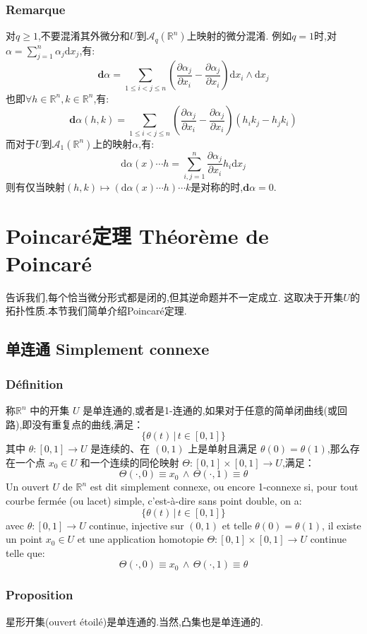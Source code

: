 \documentclass[12pt, a4paper, oneside]{ctexbook}
\newcommand{\di }{\text{d}}%
\newcommand{\pian }{\partial}%
\newcommand{\die }{\textbf{d}}%
\newcommand{\R }{\mathbb{R}}%
\begin{document}
  \subsubsection{Remarque}
  对$q\geq 1$,不要混淆其外微分和$U$到$\mathcal{A}_q(\R^n)$上映射的微分混淆.
  例如$q=1$时,对$\alpha=\sum_{j=1}^{n}\alpha_j\di x_j$,有:
  $$
  \die \alpha=\sum_{1\leq i< j\leq n}(\frac{\pian \alpha_j}{\pian x_i}-\frac{\pian\alpha_j}{\pian x_i})\di x_i\wedge\di x_j
  $$
  也即$\forall h\in\R^n,k\in\R^n$,有:
  $$
  \die \alpha(h,k)=\sum_{1\leq i< j\leq n}(\frac{\pian \alpha_j}{\pian x_i}-\frac{\pian\alpha_j}{\pian x_i})(h_ik_j-h_jk_i)
  $$
  而对于$U$到$\mathcal{A}_1(\R^n)$上的映射$\alpha$,有:
  $$
  \di\alpha(x)\cdots h=\sum_{i,j=1}^{n}\frac{\pian\alpha_j}{\pian x_i}h_i\di x_j
  $$
  则有仅当映射$(h,k)\mapsto(\di\alpha(x)\cdots h)\cdots k$是对称的时,$\die \alpha=0$.
  \section{Poincaré定理 Théorème de Poincaré}
  告诉我们,每个恰当微分形式都是闭的,但其逆命题并不一定成立.
  这取决于开集$U$的拓扑性质.本节我们简单介绍Poincaré定理.

  \subsection{单连通 Simplement connexe}
  \subsubsection{Définition}
  称$\mathbb{R}^n$ 中的开集 $U$ 是单连通的,或者是1-连通的,如果对于任意的简单闭曲线(或回路),即没有重复点的曲线,满足：
  $$
  \{\theta(t)\,|\,t\in[0,1] \}
  $$
  其中 $\theta:[0,1]\to U$ 是连续的、在 $(0,1)$ 上是单射且满足 $\theta(0)=\theta(1)$,那么存在一个点 $x_0\in U$ 和一个连续的同伦映射 $\Theta :[0,1]\times[0,1]\to U$,满足：
  $$
  \Theta (\cdot,0)\equiv x_0\, \land\, \Theta (\cdot,1)\equiv \theta
  $$
  \indent
  Un ouvert $U$ de $\R^n$ est dit simplement connexe, ou encore 1-connexe si, 
  pour tout courbe fermée (ou lacet) simple, c'est-à-dire sans point double, on a:
  $$
  \{\theta(t)\,|\,t\in[0,1] \}
  $$
  avec $\theta:[0,1]\to U$ continue, injective sur $(0,1)$ et telle $\theta(0)=\theta(1)$, il existe un point $x_0\in U$ 
  et une application homotopie $\Theta :[0,1]\times[0,1]\to U$ continue telle que:
  $$
  \Theta (\cdot,0)\equiv x_0\, \land\, \Theta (\cdot,1)\equiv \theta
  $$
  \subsubsection{Proposition}%
  星形开集(ouvert étoilé)是单连通的.当然,凸集也是单连通的.
\end{document}
